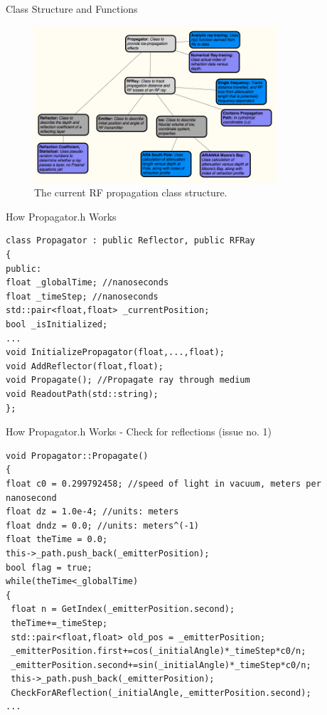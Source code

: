 \documentclass{beamer}
\begin{document}
\begin{frame}{Class Structure and Functions}
\begin{figure}
\begin{center}
\includegraphics[width=0.8\textwidth]{figures/Propagation2.png}
\caption{\label{fig:fig2} The current RF propagation class structure.}
\end{center}
\end{figure}
\end{frame}

\begin{frame}[fragile]{How Propagator.h Works}
\small
\begin{verbatim}
class Propagator : public Reflector, public RFRay
{
public:
float _globalTime; //nanoseconds
float _timeStep; //nanoseconds
std::pair<float,float> _currentPosition;
bool _isInitialized;
...
void InitializePropagator(float,...,float);
void AddReflector(float,float);
void Propagate(); //Propagate ray through medium
void ReadoutPath(std::string);
};
\end{verbatim}
\end{frame}

\begin{frame}[fragile]{How Propagator.h Works - Check for reflections (issue no. 1)}
\tiny
\begin{verbatim}
void Propagator::Propagate()
{
float c0 = 0.299792458; //speed of light in vacuum, meters per nanosecond
float dz = 1.0e-4; //units: meters
float dndz = 0.0; //units: meters^(-1)
float theTime = 0.0;
this->_path.push_back(_emitterPosition);
bool flag = true;
while(theTime<_globalTime)
{
 float n = GetIndex(_emitterPosition.second);
 theTime+=_timeStep;
 std::pair<float,float> old_pos = _emitterPosition;
 _emitterPosition.first+=cos(_initialAngle)*_timeStep*c0/n;
 _emitterPosition.second+=sin(_initialAngle)*_timeStep*c0/n;
 this->_path.push_back(_emitterPosition);
 CheckForAReflection(_initialAngle,_emitterPosition.second);
...
\end{verbatim}
\end{frame}
\end{document}
